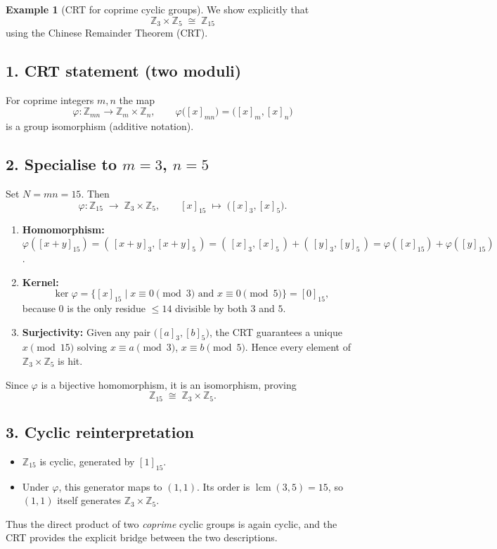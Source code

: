 \documentclass[12pt]{article}
\theoremstyle{definition} %
\newtheorem{example}{Example}
\theoremstyle{plain} %
\begin{document}
\begin{example}[CRT for coprime cyclic groups]
  We show explicitly that 
  \[
    \boxed{\;\mathbb Z_{3}\times\mathbb Z_{5}\;\cong\;\mathbb Z_{15}\;}
  \]
  using the Chinese Remainder Theorem (CRT).
  
  \subsection*{1.  CRT statement (two moduli)}
  For coprime integers $m,n$ the map
  \[
    \varphi:\mathbb Z_{mn}\longrightarrow 
            \mathbb Z_{m}\times\mathbb Z_{n},
    \qquad
    \varphi\bigl([x]_{mn}\bigr)=\bigl([x]_{m},[x]_{n}\bigr)
  \]
  is a group isomorphism (additive notation).
  
  \subsection*{2.  Specialise to $m=3$, $n=5$}
  Set $N=mn=15$.  Then
  \[
    \varphi:\mathbb Z_{15}\;\longrightarrow\;
            \mathbb Z_{3}\times\mathbb Z_{5},
    \qquad
    [x]_{15}\;\longmapsto\;\bigl([x]_{3},[x]_{5}\bigr).
  \]
  
  \begin{enumerate}[label=\textup{(\roman*)}]
    \item \textbf{Homomorphism:} 
          $\varphi([x+y]_{15})=(\,[x+y]_{3},[x+y]_{5}\,)
          =( \,[x]_{3},[x]_{5}\,)+( \,[y]_{3},[y]_{5}\,)
          =\varphi([x]_{15})+\varphi([y]_{15})$.
  
    \item \textbf{Kernel:} 
          \[
            \ker\varphi
            =\{[x]_{15}\mid x\equiv0\pmod3\text{ and }x\equiv0\pmod5\}
            =[0]_{15},
          \]
          because $0$ is the only residue $\le14$ divisible by both $3$ and $5$.
  
    \item \textbf{Surjectivity:} 
          Given any pair $\bigl([a]_{3},[b]_{5}\bigr)$,
          the CRT guarantees a unique $x\pmod{15}$ solving
          $x\equiv a\pmod3$, $x\equiv b\pmod5$.
          Hence every element of $\mathbb Z_{3}\times\mathbb Z_{5}$ is hit.
  \end{enumerate}
  
  Since $\varphi$ is a bijective homomorphism, it is an isomorphism, proving
  \[
    \mathbb Z_{15}\;\cong\;\mathbb Z_{3}\times\mathbb Z_{5}.
  \]
  
  \subsection*{3.  Cyclic reinterpretation}
  \begin{itemize}
    \item $\mathbb Z_{15}$ is cyclic, generated by $[1]_{15}$.
    \item Under $\varphi$, this generator maps to $(1,1)$.
          Its order is $\operatorname{lcm}(3,5)=15$, so 
          $(1,1)$ itself generates $\mathbb Z_{3}\times\mathbb Z_{5}$.
  \end{itemize}
  Thus the direct product of two \emph{coprime} cyclic groups is again cyclic,
  and the CRT provides the explicit bridge between the two descriptions.
  \end{example}
\end{document}
